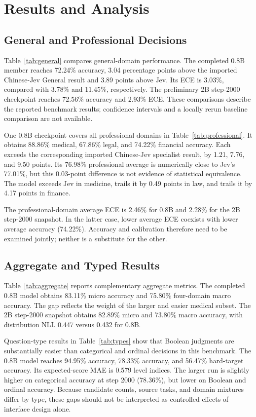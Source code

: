\section{Results and Analysis}
\label{sec:results}
\subsection{General and Professional Decisions}

Table~\ref{tab:general} compares general-domain performance. The completed 0.8B member reaches 72.24\% accuracy, 3.04 percentage points above the imported Chinese-Jev General result and 3.89 points above Jev. Its ECE is 3.03\%, compared with 3.78\% and 11.45\%, respectively. The preliminary 2B step-2000 checkpoint reaches 72.56\% accuracy and 2.93\% ECE. These comparisons describe the reported benchmark results; confidence intervals and a locally rerun baseline comparison are not available.


One 0.8B checkpoint covers all professional domains in Table~\ref{tab:professional}. It obtains 88.86\% medical, 67.86\% legal, and 74.22\% financial accuracy. Each exceeds the corresponding imported Chinese-Jev specialist result, by 1.21, 7.76, and 9.50 points. Its 76.98\% professional average is numerically close to Jev's 77.01\%, but this 0.03-point difference is not evidence of statistical equivalence. The model exceeds Jev in medicine, trails it by 0.49 points in law, and trails it by 4.17 points in finance.

The professional-domain average ECE is 2.46\% for 0.8B and 2.28\% for the 2B step-2000 snapshot. In the latter case, lower average ECE coexists with lower average accuracy (74.22\%). Accuracy and calibration therefore need to be examined jointly; neither is a substitute for the other.

\subsection{Aggregate and Typed Results}

Table~\ref{tab:aggregate} reports complementary aggregate metrics. The completed 0.8B model obtains 83.11\% micro accuracy and 75.80\% four-domain macro accuracy. The gap reflects the weight of the larger and easier medical subset. The 2B step-2000 snapshot obtains 82.89\% micro and 73.80\% macro accuracy, with distribution NLL 0.447 versus 0.432 for 0.8B.


Question-type results in Table~\ref{tab:types} show that Boolean judgments are substantially easier than categorical and ordinal decisions in this benchmark. The 0.8B model reaches 94.95\% \noul{} accuracy, 78.33\% \choice{} accuracy, and 56.47\% hard-target \score{} accuracy. Its expected-score MAE is 0.579 level indices. The larger run is slightly higher on categorical accuracy at step 2000 (78.36\%), but lower on Boolean and ordinal accuracy. Because candidate counts, source tasks, and domain mixtures differ by type, these gaps should not be interpreted as controlled effects of interface design alone.

